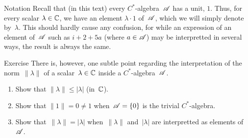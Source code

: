 \documentclass[a]{subfiles}
\begin{document}
\begin{parsec}%
\begin{point}{Notation}%
Recall that (in this text) every $C^*$-algebra~$\mathscr{A}$ has a unit, $1$.
Thus, for every scalar $\lambda\in \mathbb{C}$,
we have an element $\lambda\cdot 1$ of~$\mathscr{A}$,
which we will simply denote by~$\lambda$.
This should hardly cause any confusion,
for while an expression of an element of~$\mathscr{A}$
such as $i+2+5a$ (where $a\in \mathscr{A}$) 
may be interpretted in several ways,
the result is always the same.
\end{point}
\begin{point}{Exercise}%
There is, however, one subtle point regarding
the interpretation
of the norm~$\|\lambda\|$ of a
scalar~$\lambda\in \mathbb{C}$ inside a $C^*$-algebra~$\mathscr{A}$.
\begin{enumerate}
\item 
Show that $\|\lambda\|\leq \left| \lambda\right|$ (in~$\mathbb{C}$).
\item
Show that $\|1\|=0\neq 1$ when~$\mathscr{A}=\{0\}$ is the trivial $C^*$-algebra.
\item
Show that~$\|\lambda\|=\left|\lambda\right|$
when~$\|\lambda\|$ and~$\left|\lambda\right|$
are interpretted as elements of~$\mathscr{A}$.
\end{enumerate}
\end{point}
\end{parsec}
\end{document}
